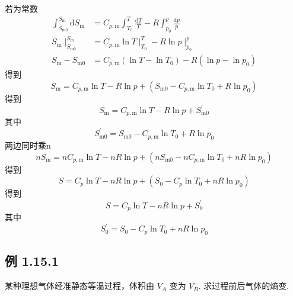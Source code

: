 若为常数
\begin{equation}
    \begin{aligned}
        \int_{S_{\mathrm{m}0}}^{S_{\mathrm{m}}}{\mathrm{d}S_{\mathrm{m}}}&=C_{p,\mathrm{m}}\int_{T_0}^T{\frac{\mathrm{d}T}{T}}-R\int_{p_0}^p{\frac{\mathrm{d}p}{p}}
\\
S_{\mathrm{m}}\mid_{S_{\mathrm{m}0}}^{S_{\mathrm{m}}}&=C_{p,\mathrm{m}}\ln T\mid_{T_0}^{T}-R\ln p\mid_{p_0}^{p}
\\
S_{\mathrm{m}}-S_{\mathrm{m}0}&=C_{p,\mathrm{m}}\left( \ln T-\ln T_0 \right) -R\left( \ln p-\ln p_0 \right) 
    \end{aligned}
\end{equation}
得到
\begin{equation}
    S_{\mathrm{m}}=C_{p,\mathrm{m}}\ln T-R\ln p+\left( S_{\mathrm{m}0}-C_{p,\mathrm{m}}\ln T_0+R\ln p_0 \right) 
\end{equation}
得到
\begin{equation}
    S_{\mathrm{m}}=C_{p,\mathrm{m}}\ln T-R\ln p+S_{\mathrm{m}0}^{\prime}
\end{equation}
其中
\begin{equation}
    S_{\mathrm{m}0}^{\prime}=S_{\mathrm{m}0}-C_{p,\mathrm{m}}\ln T_0+R\ln p_0
\end{equation}
两边同时乘n
\begin{equation}
    nS_{\mathrm{m}}=nC_{p,\mathrm{m}}\ln T-nR\ln p+\left( nS_{\mathrm{m}0}-nC_{p,\mathrm{m}}\ln T_0+nR\ln p_0 \right) 
\end{equation}
得到
\begin{equation}
    S=C_p\ln T-nR\ln p+\left( S_0-C_p\ln T_0+nR\ln p_0 \right) 
\end{equation}
得到
\begin{equation}
    S=C_p\ln T-nR\ln p+S_{0}^{\prime}
\end{equation}
其中
\begin{equation}
    S_{0}^{\prime}=S_0-C_p\ln T_0+nR\ln p_0
\end{equation}


\newpage
\subsection{例 1.15.1 }
某种理想气体经准静态等温过程，体积由 $V_{A}$ 变为 $V_{B}$. 求过程前后气体的熵变.

